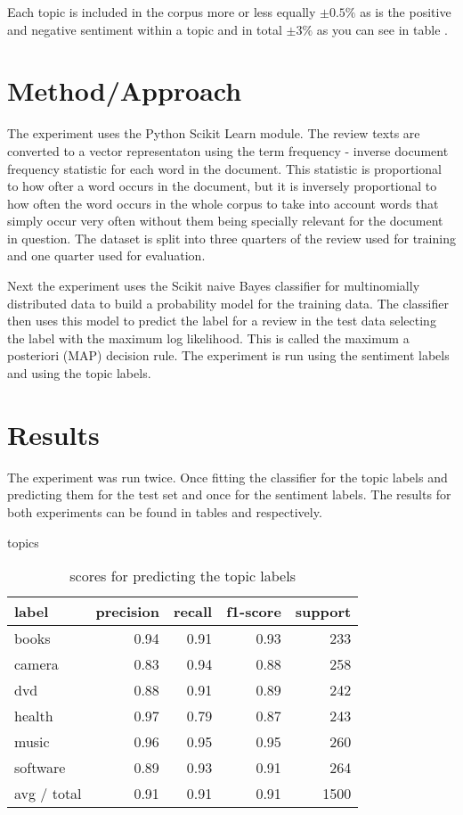 \documentclass[11pt]{article}
\begin{document}
Each topic is included in the corpus more or less equally $\pm 0.5 \%$ as is the positive and negative sentiment within a topic and in total $\pm 3 \%$ as you can see in table .

\section{Method/Approach}

The experiment uses the Python Scikit Learn module. The review texts are converted to a vector representaton using the term frequency - inverse document frequency statistic for each word in the document. This statistic is proportional to how ofter a word occurs in the document, but it is inversely proportional to how often the word occurs in the whole corpus to take into account words that simply occur very often without them being specially relevant for the document in question. The dataset is split into three quarters of the review used for training and one quarter used for evaluation.

Next the experiment uses the Scikit naive Bayes classifier for multinomially distributed data to build a probability model for the training data. The classifier then uses this model to predict the label for a review in the test data selecting the label with the maximum log likelihood. This is called the maximum a posteriori (MAP) decision rule. The experiment is run using the sentiment labels and using the topic labels.

\section{Results}

The experiment was run twice. Once fitting the classifier for the topic labels and predicting them for the test set and once for the sentiment labels. The results for both experiments can be found in tables  and  respectively.

topics
\begin{table}[h]
\begin{tabular}{ l r r r r }
label & precision & recall & f1-score & support \\
\hline
books & 0.94 & 0.91 & 0.93 & 233 \\
camera & 0.83 & 0.94 & 0.88 & 258 \\
dvd & 0.88 & 0.91 & 0.89 & 242 \\
health & 0.97 & 0.79 & 0.87 & 243 \\
music & 0.96 & 0.95 & 0.95 & 260 \\
software & 0.89 & 0.93 & 0.91 & 264 \\
\hline
avg / total & 0.91 & 0.91 & 0.91 & 1500 \\
\end{tabular}
\caption{scores for predicting the topic labels}
\end{table}
\end{document}
